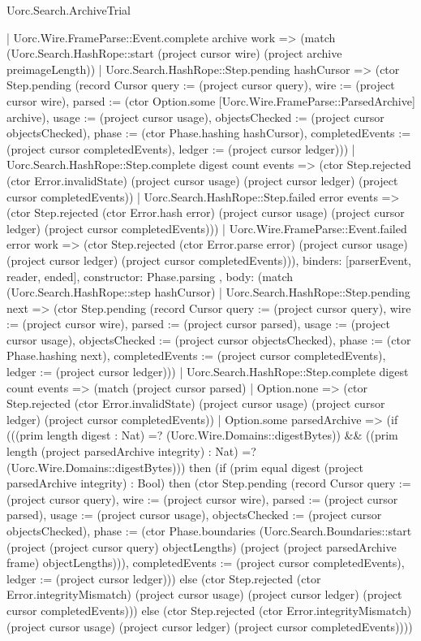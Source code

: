 \begin{lexlean}{Uorc.Search.ArchiveTrial}
\begin{semanticmodule}
{{{          | Uorc.Wire.FrameParse::Event.complete archive work => (match (Uorc.Search.HashRope::start (project cursor wire) (project archive preimageLength))
            | Uorc.Search.HashRope::Step.pending hashCursor => (ctor Step.pending (record Cursor {query := (project cursor query), wire := (project cursor wire), parsed := (ctor Option.some [Uorc.Wire.FrameParse::ParsedArchive] archive), usage := (project cursor usage), objectsChecked := (project cursor objectsChecked), phase := (ctor Phase.hashing hashCursor), completedEvents := (project cursor completedEvents), ledger := (project cursor ledger)}))
            | Uorc.Search.HashRope::Step.complete digest count events => (ctor Step.rejected (ctor Error.invalidState) (project cursor usage) (project cursor ledger) (project cursor completedEvents))
            | Uorc.Search.HashRope::Step.failed error events => (ctor Step.rejected (ctor Error.hash error) (project cursor usage) (project cursor ledger) (project cursor completedEvents)))
          | Uorc.Wire.FrameParse::Event.failed error work => (ctor Step.rejected (ctor Error.parse error) (project cursor usage) (project cursor ledger) (project cursor completedEvents))),
        binders: [parserEvent, reader, ended],
        constructor: Phase.parsing
      },
      {
        body: (match (Uorc.Search.HashRope::step hashCursor)
          | Uorc.Search.HashRope::Step.pending next => (ctor Step.pending (record Cursor {query := (project cursor query), wire := (project cursor wire), parsed := (project cursor parsed), usage := (project cursor usage), objectsChecked := (project cursor objectsChecked), phase := (ctor Phase.hashing next), completedEvents := (project cursor completedEvents), ledger := (project cursor ledger)}))
          | Uorc.Search.HashRope::Step.complete digest count events => (match (project cursor parsed)
            | Option.none => (ctor Step.rejected (ctor Error.invalidState) (project cursor usage) (project cursor ledger) (project cursor completedEvents))
            | Option.some parsedArchive => (if (((prim length digest : Nat) =? (Uorc.Wire.Domains::digestBytes)) && ((prim length (project parsedArchive integrity) : Nat) =? (Uorc.Wire.Domains::digestBytes))) then (if (prim equal digest (project parsedArchive integrity) : Bool) then (ctor Step.pending (record Cursor {query := (project cursor query), wire := (project cursor wire), parsed := (project cursor parsed), usage := (project cursor usage), objectsChecked := (project cursor objectsChecked), phase := (ctor Phase.boundaries (Uorc.Search.Boundaries::start (project (project cursor query) objectLengths) (project (project parsedArchive frame) objectLengths))), completedEvents := (project cursor completedEvents), ledger := (project cursor ledger)})) else (ctor Step.rejected (ctor Error.integrityMismatch) (project cursor usage) (project cursor ledger) (project cursor completedEvents))) else (ctor Step.rejected (ctor Error.integrityMismatch) (project cursor usage) (project cursor ledger) (project cursor completedEvents))))
}}}
\end{semanticmodule}
\end{lexlean}
